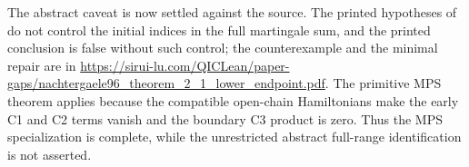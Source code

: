 \documentclass{article}
\begin{document}
The abstract caveat is now settled against the source.  The printed
hypotheses of \cite[Theorem~2.1(i)]{Nachtergaele1996Spectral} do not control
the initial indices in the full martingale sum, and the printed conclusion is
false without such control; the counterexample and the minimal repair are in
\url{https://sirui-lu.com/QICLean/paper-gaps/nachtergaele96_theorem_2_1_lower_endpoint.pdf}.  The
primitive MPS theorem applies because the compatible open-chain Hamiltonians
make the early C1 and C2 terms vanish and the boundary C3 product is zero.
Thus the MPS specialization is complete, while the unrestricted abstract
full-range identification is not asserted.



\end{document}
